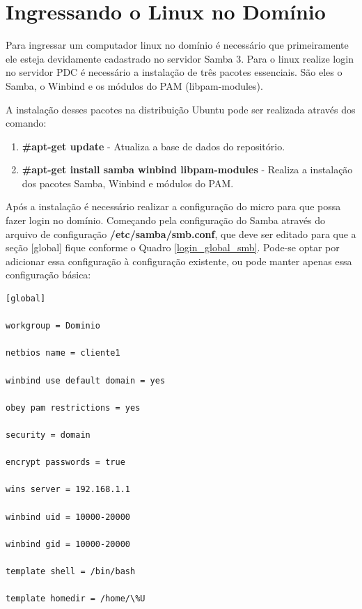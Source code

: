\begin{enumerate}
\end{enumerate}


\section{Ingressando o Linux no Domínio}

Para ingressar um computador linux no domínio é necessário que primeiramente ele esteja devidamente cadastrado no servidor Samba 3. Para o linux realize login no servidor PDC é necessário a instalação de três pacotes essenciais. São eles o Samba, o Winbind e os módulos do PAM (libpam-modules).

A instalação desses pacotes na distribuição Ubuntu pode ser realizada através dos comando:

\begin{enumerate}
	\item \textbf{\#apt-get update} - Atualiza a base de dados do repositório.
	\item \textbf{\#apt-get install samba winbind libpam-modules} - Realiza a instalação dos pacotes Samba, Winbind e módulos do PAM.
\end{enumerate}

Após a instalação é necessário realizar a configuração do micro para que possa fazer login no domínio. Começando pela configuração do Samba através do arquivo de configuração \textbf{/etc/samba/smb.conf}, que deve ser editado para que a seção [global] fique conforme o Quadro \ref{login_global_smb}. Pode-se optar por adicionar essa configuração à configuração existente, ou pode manter apenas essa configuração básica:\\

\begin{lstlisting}[caption=Arquivo smb.conf com as variáveis necessárias para fazer login em um domínio,label={login_global_smb}]	
[global]

workgroup = Dominio

netbios name = cliente1

winbind use default domain = yes

obey pam restrictions = yes

security = domain

encrypt passwords = true

wins server = 192.168.1.1

winbind uid = 10000-20000

winbind gid = 10000-20000

template shell = /bin/bash

template homedir = /home/\%U
\end{lstlisting}

